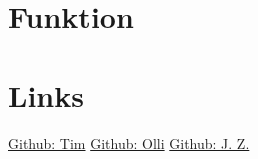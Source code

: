 \documentclass[a4paper,12pt]{article}
\begin{document}
\newpage

\section{Funktion}
\hypertarget{implosion_section}{}
\hypertarget{gun_section}{}

\newpage

\section{Links}
\begin{center}
\end{center}
\bigskip

\href{https://github.com/Tim-foe}{Github: Tim} \hspace{4cm}
\href{https://github.com/YoOlli}{Github: Olli} \hspace{4cm}
\href{https://github.com/Jason4225}{Github: J. Z.}

%
%
\end{document}
